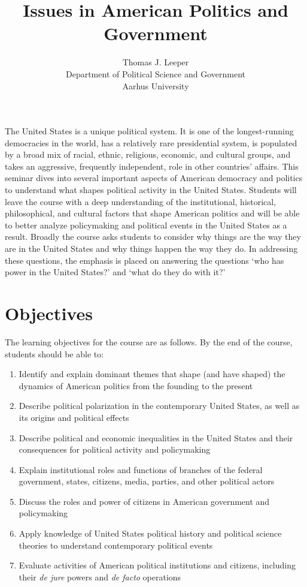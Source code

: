 \documentclass[12pt,a4paper]{article}
\title{Issues in American Politics and Government }
\author{Thomas J. Leeper\\
Department of Political Science and Government\\
Aarhus University}
\begin{document}
\nobibliography*

\maketitle

\faketableofcontents


The United States is a unique political system. It is one of the longest-running democracies in the world, has a relatively rare presidential system, is populated by a broad mix of racial, ethnic, religious, economic, and cultural groups, and takes an aggressive, frequently independent, role in other countries' affairs. This seminar dives into several important aspects of American democracy and politics to understand what shapes political activity in the United States. Students will leave the course with a deep understanding of the institutional, historical, philosophical, and cultural factors that shape American politics and will be able to better analyze policymaking and political events in the United States as a result. Broadly the course asks students to consider why things are the way they are in the United States and why things happen the way they do. In addressing these questions, the emphasis is placed on answering the questions `who has power in the United States?' and `what do they do with it?'


\section{Objectives}
The learning objectives for the course are as follows. By the end of the course, students should be able to:

\begin{enumerate}
\item Identify and explain dominant themes that shape (and have shaped) the dynamics of American politics from the founding to the present 
\item Describe political polarization in the contemporary United States, as well as its origins and political effects 
\item Describe political and economic inequalities in the United States and their consequences for political activity and policymaking 
\item Explain institutional roles and functions of branches of the federal government, states, citizens, media, parties, and other political actors 
\item Discuss the roles and power of citizens in American government and policymaking 
\item Apply knowledge of United States political history and political science theories to understand contemporary political events 
\item Evaluate activities of American political institutions and citizens, including their {\em de jure} powers and {\em de facto} operations 
\end{enumerate}
\end{document}
